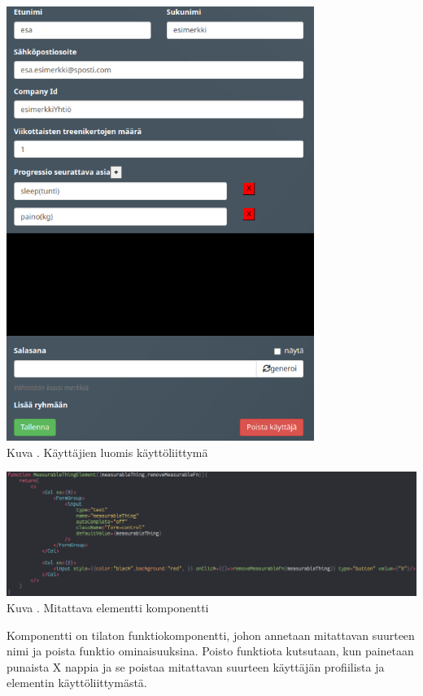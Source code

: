 \bigskip
\includegraphics[width = 10cm]{src/public/oppar/adminUserProfilePostcencoredroles.png}\\
Kuva \getImgCount {}. Käyttäjien luomis käyttöliittymä 
\bigskip


\includegraphics[width = 15cm]{src/public/oppar/measurableElementComponent.png}\\
Kuva \getImgCount {}. Mitattava elementti komponentti
\medskip

Komponentti on tilaton funktiokomponentti, johon annetaan mitattavan suurteen nimi ja poista funktio ominaisuuksina.
Poisto funktiota kutsutaan, kun painetaan punaista X nappia ja se poistaa mitattavan suurteen käyttäjän profiilista ja elementin käyttöliittymästä.
\medskip












